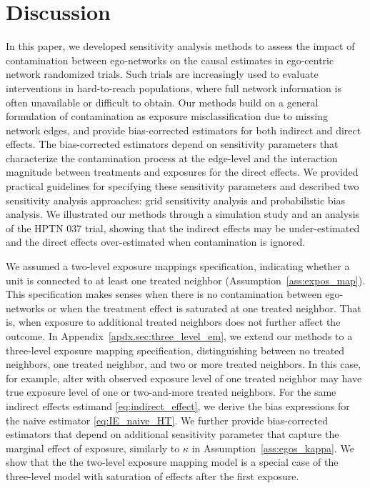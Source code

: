 \documentclass[11pt]{article}
\theoremstyle{definition}
\begin{document}
\section{Discussion}
\label{sec:discussion}
In this paper, we developed sensitivity analysis methods to assess the impact of contamination
between ego-networks on the causal estimates in ego-centric network randomized trials.
Such trials are increasingly used to evaluate interventions in hard-to-reach populations,
where full network information is often unavailable or difficult to obtain.
Our methods build on a general formulation of contamination
as exposure misclassification due to missing network edges,
and provide bias-corrected estimators for both indirect and direct effects.
The bias-corrected estimators depend on sensitivity parameters that
characterize the contamination process at the edge-level and
 the interaction magnitude between treatments and exposures for the direct effects.
We provided practical guidelines for specifying these sensitivity parameters
and described two sensitivity analysis approaches: grid sensitivity analysis and probabilistic bias analysis.
We illustrated our methods through a simulation study and an analysis of the HPTN 037 trial, 
showing that the indirect effects may be under-estimated and the direct effects over-estimated
when contamination is ignored.

We assumed a two-level exposure mappings specification, indicating 
whether a unit is connected to at least one treated neighbor (Assumption~\ref{ass:expos_map}).
This specification makes senses when there is no contamination 
between ego-networks or when the treatment effect is saturated at one treated neighbor.
That is, when exposure to additional treated neighbors does not further affect the outcome.
In Appendix~\ref{apdx.sec:three_level_em}, we extend our methods to a three-level exposure mapping specification,
 distinguishing between no treated neighbors, one treated neighbor, and two or more treated neighbors.
In this case, for example, alter with observed exposure level of one treated neighbor
may have true exposure level of one or two-and-more treated neighbors.
For the same indirect effects estimand \eqref{eq:indirect_effect},
we derive the bias expressions for the naive estimator \eqref{eq:IE_naive_HT}.
We further provide bias-corrected estimators that depend on additional sensitivity parameter 
that capture the marginal effect of exposure,
 similarly to $\kappa$ in Assumption~\ref{ass:egos_kappa}. 
We show that the the two-level exposure mapping model is a special case of the three-level model
with saturation of effects after the first exposure. 
\end{document}
